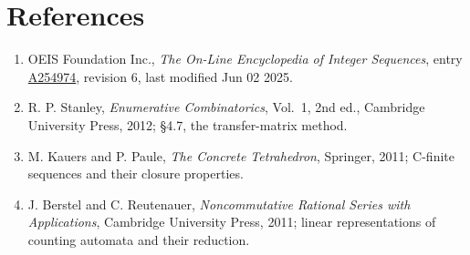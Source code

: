 \documentclass[11pt]{article}
\theoremstyle{definition}
\begin{document}
\section{References}

\begin{enumerate}

\item OEIS Foundation Inc., \emph{The On-Line Encyclopedia of Integer Sequences}, entry \href{https://oeis.org/A254974}{A254974}, revision 6, last modified Jun 02 2025.

\item R. P. Stanley, \emph{Enumerative Combinatorics}, Vol.~1, 2nd ed., Cambridge University Press, 2012; \S4.7, the transfer-matrix method.

\item M. Kauers and P. Paule, \emph{The Concrete Tetrahedron}, Springer, 2011; C-finite sequences and their closure properties.

\item J. Berstel and C. Reutenauer, \emph{Noncommutative Rational Series with Applications}, Cambridge University Press, 2011; linear representations of counting automata and their reduction.

\end{enumerate}
\end{document}
